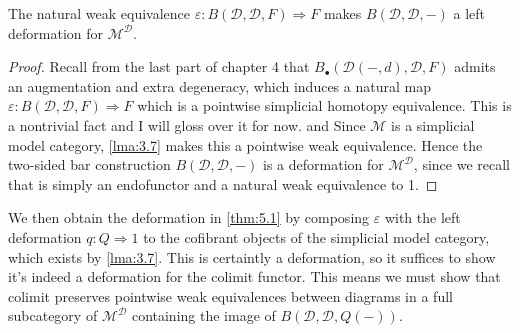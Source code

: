 \begin{lemma}\label{lma:5.1}
	The natural weak equivalence $\varepsilon : B(\mathcal{D} ,\mathcal{D} ,F) \Rightarrow F$ makes $B(\mathcal{D} ,\mathcal{D} ,-)$ a left deformation for $\mathcal{M} ^{\mathcal{D} } $.
\end{lemma}
\begin{proof}
	Recall from the last part of chapter 4 that $B_{\bullet} (\mathcal{D} (-,d),\mathcal{D} ,F)$ admits an augmentation and extra degeneracy, which induces a natural map $\varepsilon : B(\mathcal{D} ,\mathcal{D} ,F) \Rightarrow F$ which is a pointwise simplicial homotopy equivalence. This is a nontrivial fact and I will gloss over it for now. and Since $\mathcal{M} $ is a simplicial model category, \cref{lma:3.7} makes this a pointwise weak equivalence. Hence the two-sided bar construction $B(\mathcal{D} ,\mathcal{D} ,-)$ is a deformation for $\mathcal{M} ^{\mathcal{D} } $, since we recall that is simply an endofunctor and a natural weak equivalence to 1.
\end{proof}

We then obtain the deformation in \cref{thm:5.1} by composing $\varepsilon $ with the left deformation $q : Q \Rightarrow 1$ to the cofibrant objects of the simplicial model category, which exists by \cref{lma:3.7}. This is certaintly a deformation, so it suffices to show it's indeed a deformation for the colimit functor. This means we must show that colimit preserves pointwise weak equivalences between diagrams in a full subcategory of $\mathcal{M} ^\mathcal{D} $ containing the image of $B(\mathcal{D} ,\mathcal{D} ,Q(-))$.


